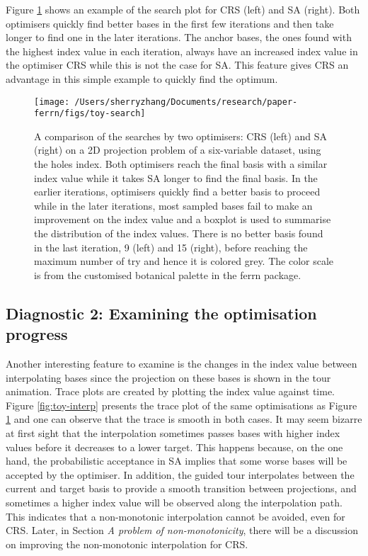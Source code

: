 Figure \ref{fig:toy-search} shows an example of the search plot for CRS
(left) and SA (right). Both optimisers quickly find better bases in the
first few iterations and then take longer to find one in the later
iterations. The anchor bases, the ones found with the highest index
value in each iteration, always have an increased index value in the
optimiser CRS while this is not the case for SA. This feature gives CRS
an advantage in this simple example to quickly find the optimum.

\begin{Schunk}
\begin{figure}

{\centering \texttt{[image: /Users/sherryzhang/Documents/research/paper-ferrn/figs/toy-search]} 

}

\caption[A comparison of the searches by two optimisers]{A comparison of the searches by two optimisers: CRS (left) and SA (right) on a 2D projection problem of a six-variable dataset,  using the holes index. Both optimisers reach the final basis with a similar index value while it takes SA longer to find the final basis. In the earlier iterations, optimisers quickly find a better basis to proceed while in the later iterations, most sampled bases fail to make an improvement on the index value and a boxplot is used to summarise the distribution of the index values. There is no better basis found in the last iteration, 9 (left) and 15 (right), before reaching the maximum number of try and hence it is colored grey. The color scale is from the customised botanical palette in the ferrn package.}\label{fig:toy-search}
\end{figure}
\end{Schunk}

\hypertarget{toy-interp}{%
\subsection{Diagnostic 2: Examining the optimisation
progress}\label{toy-interp}}

Another interesting feature to examine is the changes in the index value
between interpolating bases since the projection on these bases is shown
in the tour animation. Trace plots are created by plotting the index
value against time. Figure \ref{fig:toy-interp} presents the trace plot
of the same optimisations as Figure \ref{fig:toy-search} and one can
observe that the trace is smooth in both cases. It may seem bizarre at
first sight that the interpolation sometimes passes bases with higher
index values before it decreases to a lower target. This happens
because, on the one hand, the probabilistic acceptance in SA implies
that some worse bases will be accepted by the optimiser. In addition,
the guided tour interpolates between the current and target basis to
provide a smooth transition between projections, and sometimes a higher
index value will be observed along the interpolation path. This
indicates that a non-monotonic interpolation cannot be avoided, even for
CRS. Later, in Section \emph{A problem of non-monotonicity}, there will
be a discussion on improving the non-monotonic interpolation for CRS.

